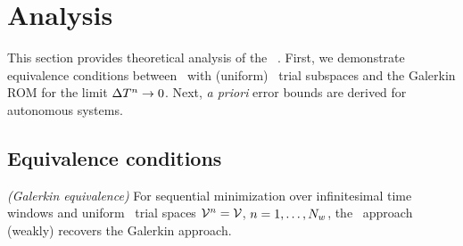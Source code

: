 \section{Analysis}\label{sec:analysis}
This section provides theoretical analysis of the \methodAcronym\ \approachKwd. First, we demonstrate equivalence conditions 
between \methodAcronym\  with (uniform) \spatialAcronym\ trial subspaces and the Galerkin ROM for the limit $\Delta T^{n} \rightarrow 0$.
Next, \textit{a priori} error bounds are derived for autonomous systems. 
\subsection{Equivalence conditions}
\begin{theorem}\label{theorem:galerkin_equiv}\textit{(Galerkin equivalence)}
For sequential minimization over infinitesimal time windows and uniform \spatialAcronym\ trial spaces $\mathcal{V }^{n} = \mathcal{V }$, $n=1,\ldots,N_w$, the \methodAcronym\ approach (weakly) recovers the Galerkin approach.
\end{theorem}
